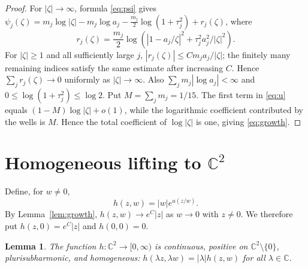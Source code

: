 \documentclass{amsart}
\newcommand{\C}{\mathbb C}
\newtheorem{lemma}[theorem]{Lemma}
\theoremstyle{remark}
\begin{document}
\begin{proof}
For $|\zeta|\to\infty$, formula \eqref{eq:psi} gives
$\psi_j(\zeta)=m_j\log|\zeta|-m_j\log a_j-\frac{m_j}{2}\log(1+\tau_j^2)+r_j(\zeta)$,
where
\[
 r_j(\zeta)=\frac{m_j}{2}\log\left(|1-a_j/\zeta|^2+\tau_j^2a_j^2/|\zeta|^2\right).
\]
For $|\zeta|\ge1$ and all sufficiently large $j$, $|r_j(\zeta)|\le Cm_ja_j/|\zeta|$; the finitely many remaining indices satisfy the same estimate after increasing $C$. Hence $\sum_jr_j(\zeta)\to0$ uniformly as $|\zeta|\to\infty$. Also $\sum_jm_j|\log a_j|<\infty$ and $0\le\log(1+\tau_j^2)\le\log2$. Put $M=\sum_jm_j=1/15$. The first term in \eqref{eq:u} equals $(1-M)\log|\zeta|+o(1)$, while the logarithmic coefficient contributed by the wells is $M$. Hence the total coefficient of $\log|\zeta|$ is one, giving \eqref{eq:growth}.
\end{proof}

\section{Homogeneous lifting to $\C^2$}

Define, for $w\ne0$,
\begin{equation}\label{eq:h}
 h(z,w)=|w|e^{u(z/w)}.
\end{equation}
By Lemma~\ref{lem:growth}, $h(z,w)\to e^C|z|$ as $w\to0$ with $z\ne0$. We therefore put $h(z,0)=e^C|z|$ and $h(0,0)=0$.

\begin{lemma}\label{lem:h}
The function $h:\C^2\to[0,\infty)$ is continuous, positive on $\C^2\setminus\{0\}$, plurisubharmonic, and homogeneous: $h(\lambda z,\lambda w)=|\lambda|h(z,w)$ for all $\lambda\in\C$.
\end{lemma}
\end{document}
